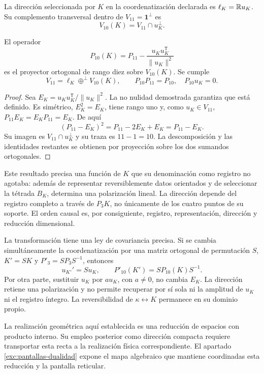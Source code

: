 \begin{definition}
La dirección seleccionada por \(K\) en la coordenatización declarada es
\(\ell_K=\mathbb R u_K\). Su complemento transversal dentro de
\(V_{11}=\mathbf1^\perp\) es
\[
 V_{10}(K)=V_{11}\cap u_K^\perp.
\]
\end{definition}

\begin{proposition}
\label{prop:k-reduccion-diez}
El operador
\begin{equation}
 P_{10}(K)=P_{11}
       -\frac{u_Ku_K^{\mathsf T}}{\lVert u_K\rVert^2}
 \label{eq:k-proyector-diez}
\end{equation}
es el proyector ortogonal de rango diez sobre \(V_{10}(K)\). Se cumple
\[
 V_{11}=\ell_K\mathbin{\oplus^{\perp}}V_{10}(K),
 \qquad P_{10}P_{11}=P_{10},\quad P_{10}u_K=0.
\]
\end{proposition}
\begin{proof}
Sea \(E_K=u_Ku_K^{\mathsf T}/\lVert u_K\rVert^2\). La
no nulidad demostrada garantiza que está definido. Es simétrico,
\(E_K^2=E_K\), tiene rango uno y, como \(u_K\in V_{11}\),
\(P_{11}E_K=E_KP_{11}=E_K\). De aquí
\[
 (P_{11}-E_K)^2=P_{11}-2E_K+E_K=P_{11}-E_K.
\]
Su imagen es \(V_{11}\cap u_K^\perp\) y su traza es
\(11-1=10\). La descomposición y las identidades restantes se
obtienen por proyección sobre los dos sumandos ortogonales.
\end{proof}

Este resultado precisa una función de \(K\) que su denominación como
registro no agotaba: además de representar reversiblemente datos
orientados y de seleccionar la tétrada \(B_K\), determina una
polarización lineal. La dirección depende del registro completo a
través de \(P_3K\), no únicamente de los cuatro puntos de su soporte.
El orden causal es, por consiguiente, registro, representación,
dirección y reducción dimensional.

La transformación tiene una ley de covariancia precisa. Si se cambia
simultáneamente la coordenatización por una matriz ortogonal de permutación \(S\),
\(K'=SK\) y \(P'_3=SP_3S^{-1}\), entonces
\[
 u_{K'}'=Su_K,\qquad P'_{10}(K')=SP_{10}(K)S^{-1}.
\]
Por otra parte, sustituir \(u_K\) por \(a u_K\), con \(a\ne0\),
no cambia \(E_K\). La dirección retiene una polarización y no
permite recuperar por sí sola ni la amplitud de \(u_K\) ni el
registro íntegro. La reversibilidad de \(\kappa\leftrightarrow K\)
permanece en su dominio propio.

La realización geométrica aquí establecida es una reducción de espacios
con producto interno. Su empleo posterior como dirección compacta
requiere transportar esta recta a la realización física correspondiente.
El apartado \ref{exc:pantallas-dualidad} expone el mapa algebraico
que mantiene coordinadas esta reducción y la pantalla reticular.
